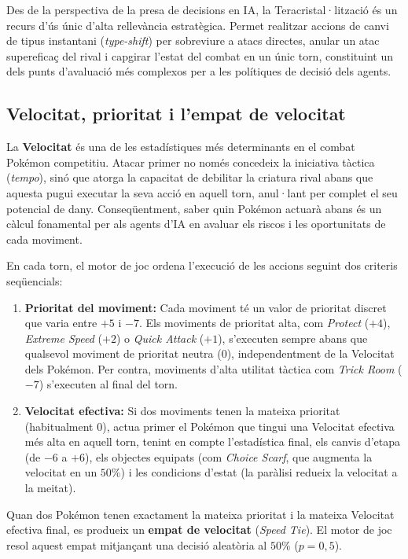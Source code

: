 Des de la perspectiva de la presa de decisions en IA, la Teracristal·lització és un recurs d'ús únic d'alta rellevància estratègica. Permet realitzar accions de canvi de tipus instantani (\emph{type-shift}) per sobreviure a atacs directes, anular un atac supereficaç del rival i capgirar l'estat del combat en un únic torn, constituint un dels punts d'avaluació més complexos per a les polítiques de decisió dels agents.

\subsection{Velocitat, prioritat i l'empat de velocitat}
\label{subsec:velocitat}

La \textbf{Velocitat} és una de les estadístiques més determinants en el combat Pokémon competitiu. Atacar primer no només concedeix la iniciativa tàctica (\emph{tempo}), sinó que atorga la capacitat de debilitar la criatura rival abans que aquesta pugui executar la seva acció en aquell torn, anul·lant per complet el seu potencial de dany. Conseqüentment, saber quin Pokémon actuarà abans és un càlcul fonamental per als agents d'IA en avaluar els riscos i les oportunitats de cada moviment.

En cada torn, el motor de joc ordena l'execució de les accions seguint dos criteris seqüencials:

\begin{enumerate}
    \item \textbf{Prioritat del moviment:} Cada moviment té un valor de prioritat discret que varia entre $+5$ i $-7$. Els moviments de prioritat alta, com \emph{Protect} ($+4$), \emph{Extreme Speed} ($+2$) o \emph{Quick Attack} ($+1$), s'executen sempre abans que qualsevol moviment de prioritat neutra ($0$), independentment de la Velocitat dels Pokémon. Per contra, moviments d'alta utilitat tàctica com \emph{Trick Room} ($-7$) s'executen al final del torn.
    \item \textbf{Velocitat efectiva:} Si dos moviments tenen la mateixa prioritat (habitualment $0$), actua primer el Pokémon que tingui una Velocitat efectiva més alta en aquell torn, tenint en compte l'estadística final, els canvis d'etapa (de $-6$ a $+6$), els objectes equipats (com \emph{Choice Scarf}, que augmenta la velocitat en un $50\%$) i les condicions d'estat (la paràlisi redueix la velocitat a la meitat).
\end{enumerate}

Quan dos Pokémon tenen exactament la mateixa prioritat i la mateixa Velocitat efectiva final, es produeix un \textbf{empat de velocitat} (\emph{Speed Tie}). El motor de joc resol aquest empat mitjançant una decisió aleatòria al $50\%$ ($p=0{,}5$).

